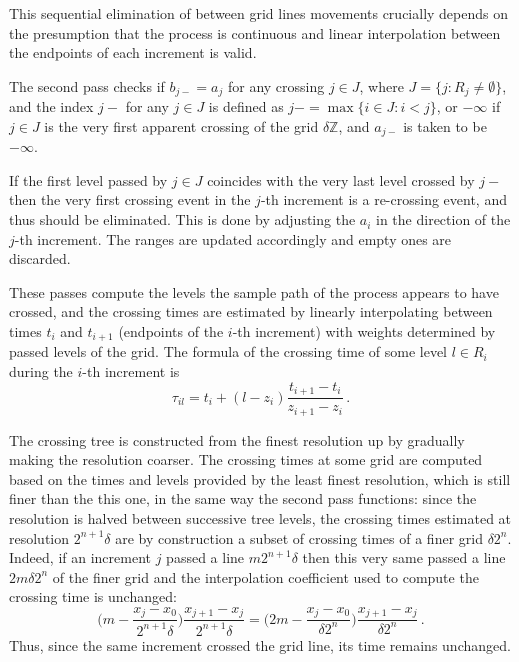 \documentclass[a4paper]{article}
\begin{document}
This sequential elimination of between grid lines movements crucially depends on
the presumption that the process is continuous and linear interpolation between
the endpoints of each increment is valid.

The second pass checks if $b_{j-} = a_j$ for any crossing $j\in J$, where
$J = \{j : R_j\neq \emptyset\}$, and the index $j-$ for any $j\in J$ is defined as
$j- = \max\{i\in J : i < j\}$, or $-\infty$ if $j\in J$ is the very first apparent
crossing of the grid $\delta \mathbb{Z}$, and $a_{j-}$ is taken to be $-\infty$.

If the first level passed by $j\in J$ coincides with the very last level crossed
by $j-$ then the very first crossing event in the $j$-th increment is a re-crossing
event, and thus should be eliminated. This is done by adjusting the $a_i$ in the
direction of the $j$-th increment. The ranges are updated accordingly and empty
ones are discarded.

These passes compute the levels the sample path of the process appears to have
crossed, and the crossing times are estimated by linearly interpolating between
times $t_i$ and $t_{i+1}$ (endpoints of the $i$-th increment) with weights determined
by passed levels of the grid. The formula of the crossing time of some level $l\in R_i$
during the $i$-th increment is
\[ \tau_{il} = t_i + (l - z_i) \frac{t_{i+1} - t_i}{z_{i+1} - z_i} \,. \]

The crossing tree is constructed from the finest resolution up by gradually making
the resolution coarser. The crossing times at some grid are computed based on the 
times and levels provided by the least finest resolution, which is still finer than
the this one, in the same way the second pass functions: since the resolution is
halved between successive tree levels, the crossing times estimated at resolution
$2^{n+1} \delta$ are by construction a subset of crossing times of a finer grid
$\delta 2^n$. Indeed, if an increment $j$ passed a line $m 2^{n+1} \delta$ then
this very same passed a line $2m \delta 2^n$ of the finer grid and the interpolation
coefficient used to compute the crossing time is unchanged:
\[
    \biggl( m - \frac{x_j - x_0}{2^{n+1} \delta} \biggr) \frac{x_{j+1} - x_j}{2^{n+1} \delta}
    = \biggl( 2m - \frac{x_j - x_0}{\delta 2^n} \biggr) \frac{x_{j+1} - x_j}{\delta 2^n} \,.
\]
Thus, since the same increment crossed the grid line, its time remains unchanged.
\end{document}
